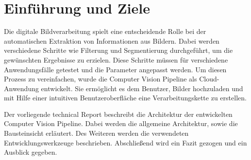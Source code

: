 \section{Einführung und Ziele}
Die digitale Bildverarbeitung spielt eine entscheidende Rolle bei der automatischen Extraktion von Informationen aus Bildern. Dabei werden verschiedene Schritte wie Filterung und Segmentierung durchgeführt, um die gewünschten Ergebnisse zu erzielen. Diese Schritte müssen für verschiedene Anwendungsfälle getestet und die Parameter angepasst werden. Um diesen Prozess zu vereinfachen, wurde die \glqq Computer Vision Pipeline\grqq{} als Cloud-Anwendung entwickelt. Sie ermöglicht es dem Benutzer, Bilder hochzuladen und mit Hilfe einer intuitiven Benutzeroberfläche eine Verarbeitungskette zu erstellen.

Der vorliegende technical Report beschreibt die Architektur der entwickelten \glqq Computer Vision Pipeline\grqq{}. Dabei werden die allgemeine Architektur, sowie die Bausteinsicht erläutert. Des Weiteren werden die verwendeten Entwicklungswerkzeuge beschrieben. Abschließend wird ein Fazit gezogen und ein Ausblick gegeben.